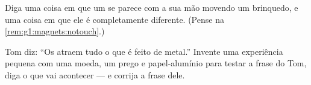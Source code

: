 \begin{exercise}[$\star$]\label{exo:g1:magnets:8}
Diga uma coisa em que um  se parece com a sua mão movendo um
brinquedo, e uma coisa em que ele é completamente diferente. (Pense
na \cref{rem:g1:magnets:notouch}.)
\end{exercise}

\begin{exercise}[$\star\star$]\label{exo:g1:magnets:9}
Tom diz: ``Os  atraem tudo o que é feito de metal.'' Invente uma
experiência pequena com uma moeda, um prego e papel-alumínio para
testar a frase do Tom, diga o que vai acontecer --- e corrija a frase
dele.
\end{exercise}
